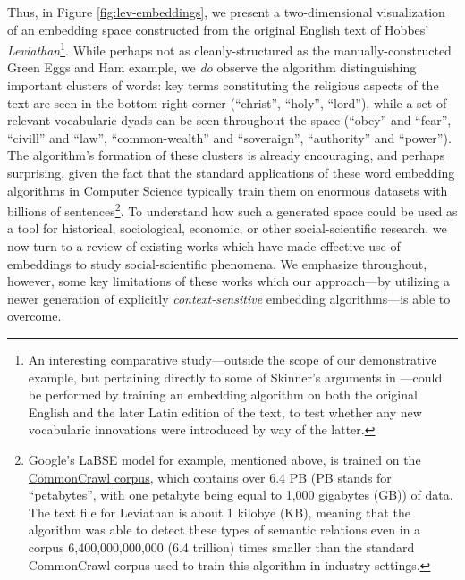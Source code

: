 \documentclass[11pt]{article}
\begin{document}
Thus, in Figure \ref{fig:lev-embeddings}, we present a two-dimensional visualization of an embedding space constructed from the original English text of Hobbes' \textit{Leviathan}\footnote{An interesting comparative study---outside the scope of our demonstrative example, but pertaining directly to some of Skinner's arguments in \cite{skinner_hobbes_2008}---could be performed by training an embedding algorithm on both the original English and the later Latin edition of the text, to test whether any new vocabularic innovations were introduced by way of the latter.}. While perhaps not as cleanly-structured as the manually-constructed Green Eggs and Ham example, we \textit{do} observe the algorithm distinguishing important clusters of words: key terms constituting the religious aspects of the text are seen in the bottom-right corner (``christ'', ``holy'', ``lord''), while a set of relevant vocabularic dyads can be seen throughout the space (``obey'' and ``fear'', ``civill'' and ``law'', ``common-wealth'' and ``soveraign'', ``authority'' and ``power''). The algorithm's formation of these clusters is already encouraging, and perhaps surprising, given the fact that the standard applications of these word embedding algorithms in Computer Science typically train them on enormous datasets with billions of sentences\footnote{Google's LaBSE model for example, mentioned above, is trained on the \href{https://commoncrawl.org/}{CommonCrawl corpus}, which contains over 6.4 PB (PB stands for ``petabytes'', with one petabyte being equal to 1,000 gigabytes (GB)) of data. The text file for Leviathan is about 1 kilobye (KB), meaning that the algorithm was able to detect these types of semantic relations even in a corpus 6,400,000,000,000 (6.4 trillion) times smaller than the standard CommonCrawl corpus used to train this algorithm in industry settings.}. To understand how such a generated space could be used as a tool for historical, sociological, economic, or other social-scientific research, we now turn to a review of existing works which have made effective use of embeddings to study social-scientific phenomena. We emphasize throughout, however, some key limitations of these works which our approach---by utilizing a newer generation of explicitly \textit{context-sensitive} embedding algorithms---is able to overcome.

\end{document}
